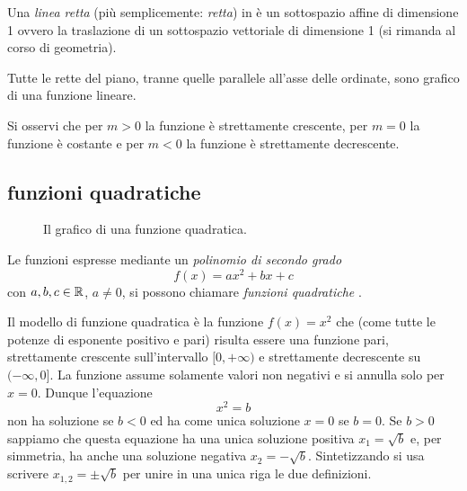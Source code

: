 \begin{definition}[retta]
  Una \emph{linea retta} (più semplicemente: \emph{retta}) in è un sottospazio affine di dimensione 1 
  ovvero la traslazione di un sottospazio vettoriale di dimensione 1
  (si rimanda al corso di geometria).
\end{definition}

Tutte le rette del piano, 
tranne quelle parallele all'asse delle ordinate,
sono grafico di una funzione lineare.

Si osservi che per $m>0$ la funzione è strettamente crescente,
per $m=0$ la funzione è costante e per $m<0$ la funzione è
strettamente decrescente.

\subsection{funzioni quadratiche}
\label{sec:funzioni_quadratiche}

\begin{figure}
  \begin{center}
  \end{center}
  \caption{Il grafico di una funzione quadratica.}
  \label{fig:funzione_quadratica}
\end{figure}

Le funzioni espresse mediante un \emph{polinomio di secondo grado}%
%
\begin{equation}\label{eq:funzione_quadratica}
  f(x) = ax^2 + bx +c
\end{equation}
con $a,b,c\in {\mathbb R}$, $a\neq 0$, si possono chiamare
\emph{funzioni quadratiche}%
%
.

Il modello di funzione quadratica è la funzione
$f(x) = x^2$ che (come tutte le potenze di esponente positivo e pari)
risulta essere una funzione pari, strettamente crescente
sull'intervallo $[0,+\infty)$ e strettamente decrescente
su $(-\infty,0]$. La funzione assume solamente valori non negativi
e si annulla solo per $x=0$.
Dunque l'equazione
\[
  x^2 = b
\]
non ha soluzione se $b<0$ ed ha come unica soluzione $x=0$ se $b=0$.
Se $b>0$ sappiamo che
questa equazione ha una unica soluzione positiva $x_1 = \sqrt{b}$
e, per simmetria, ha anche una soluzione negativa $x_2 = -\sqrt{b}$.
Sintetizzando si usa scrivere $x_{1,2} = \pm \sqrt{b}$
per unire in una unica riga le due definizioni.

